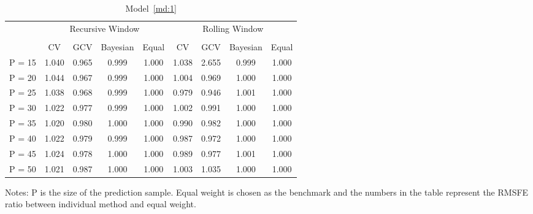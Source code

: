 \begin{table}
\caption{Model~\ref{md:1}} \label{tb:8}
\centering
\begin{adjustbox}{keepaspectratio}
\begin{threeparttable}
\begin{tabular}{lcccccccc}
\toprule
 & \multicolumn{4}{c}{Recursive Window} & \multicolumn{4}{c}{Rolling Window}\\%
\cmidrule(r){2-5}
\cmidrule(r){6-9}\\
       & CV   & GCV  & Bayesian & Equal & CV   & GCV  & Bayesian & Equal \\
P = 15 & 1.040& 0.965& 0.999    & 1.000 & 1.038& 2.655& 0.999    & 1.000\\
P = 20 & 1.044& 0.967& 0.999& 1.000& 1.004& 0.969& 1.000& 1.000\\
P = 25 & 1.038& 0.968& 0.999& 1.000& 0.979& 0.946& 1.001& 1.000\\
P = 30 & 1.022& 0.977& 0.999& 1.000& 1.002& 0.991& 1.000& 1.000\\
P = 35 & 1.020& 0.980& 1.000& 1.000& 0.990& 0.982& 1.000& 1.000\\
P = 40 & 1.022& 0.979& 0.999& 1.000& 0.987& 0.972& 1.000& 1.000\\
P = 45 & 1.024& 0.978& 1.000& 1.000& 0.989& 0.977& 1.001& 1.000\\
P = 50 & 1.021& 0.987& 1.000& 1.000& 1.003& 1.035& 1.000& 1.000\\
\bottomrule
\end{tabular}
\begin{tablenotes} \footnotesize
Notes: $\mathrm{P}$ is the size of the prediction sample. Equal weight is chosen as the benchmark and the numbers in the table represent the RMSFE ratio between individual method and equal weight.
\end{tablenotes}
\end{threeparttable}
\end{adjustbox}
\end{table}

